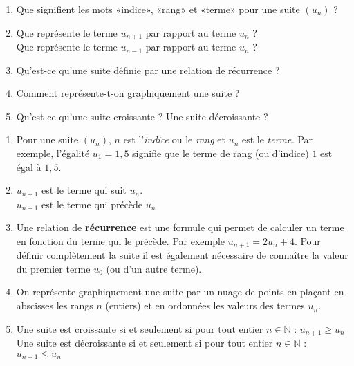 
%
\begin{enumerate}
     \item
     Que signifient les mots «indice», «rang» et «terme» pour une suite $\left(u_{n}\right)$ ?
     \item
     Que représente le terme $u_{n+1}$ par rapport au terme $u_{n}$ ?
\\
     Que représente le terme $u_{n-1}$ par rapport au terme $u_{n}$ ?
     \item
     Qu'est-ce qu'une suite définie par une relation de récurrence ?
     \item
     Comment représente-t-on graphiquement une suite ?
     \item
     Qu'est ce qu'une suite croissante ? Une suite décroissante ?
\end{enumerate}
\begin{corrige}
     \begin{enumerate}
          \item
          Pour une suite $\left(u_{n}\right)$, $n$ est l'\textit{indice} ou le \textit{rang} et $u_{n}$ est le \textit{terme.}
          Par exemple, l'égalité $u_{1}=1,5$ signifie que le terme de rang (ou d'indice) $1$ est égal à $1,5$.
          \item
          $u_{n+1}$ est le terme qui suit $u_{n}$.
\\
          $u_{n-1}$ est le terme qui précède $u_{n}$
          \item
          Une relation de \textbf{récurrence} est une formule qui permet de calculer un terme en fonction du terme qui le précède. Par exemple $u_{n+1}=2u_{n}+4$. Pour définir complètement la suite il est également nécessaire de connaître la valeur du premier terme $u_{0}$ (ou d'un autre terme).
          \item
          On représente graphiquement une suite par un nuage de points en plaçant en abscisses les rangs  $n$ (entiers) et en ordonnées les valeurs des termes $u_{n}$.
          \item
          Une suite est croissante si et seulement si pour tout entier $n \in  \mathbb{N}$ : $u_{n+1} \geqslant  u_{n}$
\\
          Une suite est décroissante si et seulement si pour tout entier $n \in  \mathbb{N}$ : $u_{n+1} \leqslant  u_{n}$
     \end{enumerate}
\end{corrige}
